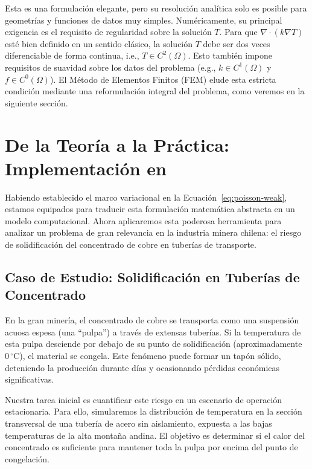 Esta es una formulación elegante, pero su resolución analítica solo es posible para geometrías y funciones de datos muy simples. Numéricamente, su principal exigencia es el requisito de regularidad sobre la solución \(T\). Para que \(\nabla \cdot (k \nabla T)\) esté bien definido en un sentido clásico, la solución \(T\) debe ser dos veces diferenciable de forma continua, i.e., \(T \in C^2(\Omega)\). Esto también impone requisitos de suavidad sobre los datos del problema (e.g., \(k \in C^1(\Omega)\) y \(f \in C^0(\Omega)\)). El Método de Elementos Finitos (FEM) elude esta estricta condición mediante una reformulación integral del problema, como veremos en la siguiente sección.


\section{De la Teoría a la Práctica: Implementación en \fenics}
\label{sec:poisson-fenics}

Habiendo establecido el marco variacional en la Ecuación~\eqref{eq:poisson-weak}, estamos equipados para traducir esta formulación matemática abstracta en un modelo computacional. Ahora aplicaremos esta poderosa herramienta para analizar un problema de gran relevancia en la industria minera chilena: el riesgo de solidificación del concentrado de cobre en tuberías de transporte.

\subsection{Caso de Estudio: Solidificación en Tuberías de Concentrado}
En la gran minería, el concentrado de cobre se transporta como una suspensión acuosa espesa (una ``pulpa'') a través de extensas tuberías. Si la temperatura de esta pulpa desciende por debajo de su punto de solidificación (aproximadamente \(0 \, ^\circ\text{C}\)), el material se congela. Este fenómeno puede formar un tapón sólido, deteniendo la producción durante días y ocasionando pérdidas económicas significativas.

Nuestra tarea inicial es cuantificar este riesgo en un escenario de operación estacionaria. Para ello, simularemos la distribución de temperatura en la sección transversal de una tubería de acero sin aislamiento, expuesta a las bajas temperaturas de la alta montaña andina. El objetivo es determinar si el calor del concentrado es suficiente para mantener toda la pulpa por encima del punto de congelación.


